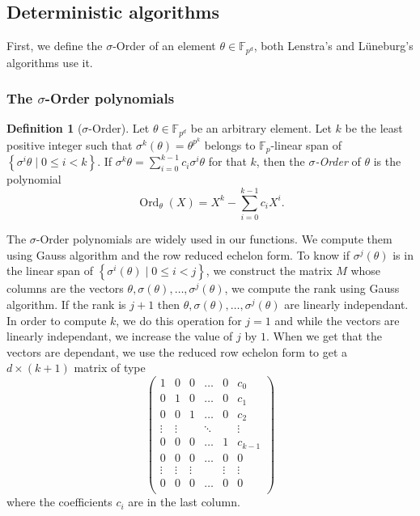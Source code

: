 \documentclass[a4paper,11pt]{article}
\theoremstyle{break}
\theoremstyle{sc}
\theoremstyle{definition}
\newtheorem{defi}[thm]{Definition}
\theoremstyle{remark}
\DeclareMathOperator{\Ord}{Ord}
\begin{document}
\subsection{Deterministic algorithms}

First, we define the $\sigma$-Order of an element
$\theta\in\mathbb{F}_{p^d}$, both Lenstra's and Lüneburg's algorithms use it.

\subsubsection{The $\sigma$-Order polynomials}

\begin{defi}[$\sigma$-Order]
  Let $\theta\in\mathbb{F}_{p^d}$ be an arbitrary element. Let $k$ be the least
  positive integer such that $\sigma^k(\theta)=\theta^{p^k}$ belongs to
  $\mathbb{F}_p$-linear span of $\left\{ \sigma^i\theta\;|\;0\leq i < k
  \right\}$. If $\sigma^k\theta=\sum_{i=0}^{k-1}c_i\sigma^i\theta$ for that
  $k$, then the \emph{$\sigma$-Order} of $\theta$ is the polynomial
  \[
    \Ord_\theta(X)=X^k-\sum_{i=0}^{k-1}c_iX^i.
  \]
\end{defi}
The $\sigma$-Order polynomials are widely used in our functions. We compute
them using Gauss algorithm and the row reduced echelon form. To know if
$\sigma^j(\theta)$ is in the linear span of $\left\{
\sigma^i(\theta)\;|\; 0\leq i <j \right\}$, we construct the matrix $M$ whose columns are the
vectors $\theta, \sigma(\theta), \dots, \sigma^{j}(\theta)$, we compute
the rank using Gauss algorithm. If the rank is $j+1$ then $\theta,
\sigma(\theta), \dots, \sigma^j(\theta)$ are linearly independant. In order to
compute $k$, we do this operation for $j=1$ and while the vectors are linearly
independant, we increase the value of $j$ by $1$. When we get that the
vectors are dependant, we use the reduced row echelon form to get a
$d\times(k+1)$ matrix of type 
\[
\begin{pmatrix}
  1 & 0 & 0 & \dots & 0 & c_0 \\
  0 & 1 & 0 & \dots & 0 & c_1 \\
  0 & 0 & 1 & \dots & 0 & c_2 \\
  \vdots & \vdots & & \ddots & & \vdots \\
  0 & 0 & 0 & \dots & 1 & c_{k-1} \\
  0 & 0 & 0 & \dots & 0 & 0 \\
  \vdots & \vdots & \vdots & & \vdots & \vdots \\
  0 & 0 & 0 & \dots & 0 & 0 \\
\end{pmatrix}
\]
where the coefficients $c_i$ are in the last column. 
  
\end{document}
